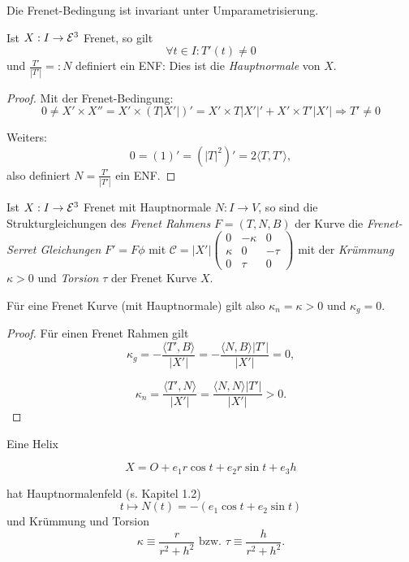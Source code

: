 \begin{remark}
	Die Frenet-Bedingung ist invariant unter Umparametrisierung.
\end{remark}

\begin{lemma, definition}
	Ist $X: I \rightarrow \mathcal E^3$ Frenet, so gilt \[ \forall t \in I : T'(t) \not = 0 \] und $\frac{T'}{|T'|} =: N$ definiert ein ENF: Dies ist die \emph{Hauptnormale} von $X$.
\end{lemma, definition}

\begin{proof}
	Mit der Frenet-Bedingung:
	\[0 \not = X' \times X''= X' \times (T|X'|)' = X' \times T|X'|' + X'\times T'|X'| \Rightarrow T' \not = 0 \]
	
	Weiters: \[ 0 = (1)' = (|T|^2)' = 2\langle T,T' \rangle, \]
	also definiert $N = \frac{T'}{|T'|}$ ein ENF.
\end{proof}

\begin{lemma, definition}
	Ist $X: I \rightarrow \mathcal E^3$ Frenet mit Hauptnormale $N: I \rightarrow V$, so sind die Strukturgleichungen des \emph{Frenet Rahmens} $F = (T,N,B)$ der Kurve die \emph{Frenet-Serret Gleichungen} $F' = F\phi$ mit $\mathcal{C} = |X'|\begin{pmatrix}
	0 & - \kappa & 0\\
	\kappa & 0 & - \tau \\
	0 & \tau & 0
	\end{pmatrix}$
	 mit der \emph{Krümmung} $\kappa > 0$ und \emph{Torsion} $\tau$ der Frenet Kurve $X$.
\end{lemma, definition}

\begin{remark}
	Für eine Frenet Kurve (mit Hauptnormale) gilt also $\kappa_n = \kappa > 0$ und $\kappa_g = 0$.
\end{remark}

\begin{proof}
	Für einen Frenet Rahmen gilt 
	\[ \kappa_g = - \frac{\langle T', B \rangle}{|X'|} = - \frac{\langle N, B \rangle |T'|}{|X'|} = 0, \]
	
	\[ \kappa_n = \frac{\langle T', N \rangle}{|X'|} = \frac{\langle N, N \rangle |T'|}{|X'|} >0. \]
\end{proof}

\begin{example}
	Eine Helix
	
	\[ X = O + e_1 r \cos t + e_2 r \sin t + e_3 h \]
	
	hat Hauptnormalenfeld (s. Kapitel 1.2) \[ t \mapsto N(t) = - (e_1 \cos t + e_2 \sin t) \] und Krümmung und Torsion 
	\[ \kappa \equiv \frac{r}{r^2 +h^2} \text{ bzw. } \tau \equiv \frac{h}{r^2+h^2} . \]
\end{example}

